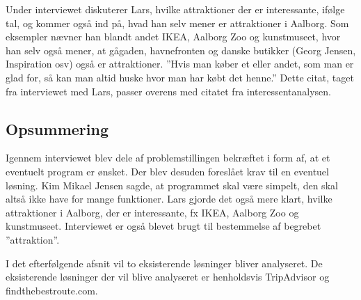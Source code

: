 Under interviewet diskuterer Lars, hvilke attraktioner der er interessante, ifølge tal, og kommer også ind på, hvad han selv mener er attraktioner i Aalborg. Som eksempler nævner han blandt andet IKEA, Aalborg Zoo og kunstmuseet, hvor han selv også mener, at gågaden, havnefronten og danske butikker (Georg Jensen, Inspiration osv) også er attraktioner. ”Hvis man køber et eller andet, som man er glad for, så kan man altid huske hvor man har købt det henne.” Dette citat, taget fra interviewet med Lars, passer overens med citatet fra interessentanalysen.
\subsection{Opsummering}
Igennem interviewet blev dele af problemstillingen bekræftet i form af, at et eventuelt program er ønsket. Der blev desuden foreslået krav til en eventuel løsning. Kim Mikael Jensen sagde, at programmet skal være simpelt, den skal altså ikke have for mange funktioner. Lars gjorde det også mere klart, hvilke attraktioner i Aalborg, der er interessante, fx IKEA, Aalborg Zoo og kunstmuseet. Interviewet er også blevet brugt til bestemmelse af begrebet ”attraktion”. 

I det efterfølgende afsnit vil to eksisterende løsninger bliver analyseret. De eksisterende løsninger der vil blive analyseret er henholdsvis TripAdvisor og findthebestroute.com.
